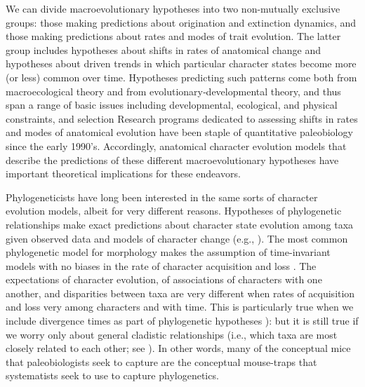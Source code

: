 \documentclass{article}
\begin{document}
We can divide macroevolutionary hypotheses into two non-mutually exclusive groups: those making predictions about origination and extinction dynamics, and those making predictions about rates and modes of trait evolution. 
The latter group includes hypotheses about shifts in rates of anatomical change and hypotheses about driven trends in which particular character states become more (or less) common over time.  
Hypotheses predicting such patterns come both from macroecological theory and from evolutionary‑developmental theory, and thus span a range of basic issues including developmental, ecological, and physical constraints, and selection  \citep{valentine1969patterns, valentine1980determinants}
Research programs dedicated to assessing shifts in rates and modes of anatomical evolution have been staple of quantitative paleobiology since the early 1990’s. 
Accordingly, anatomical character evolution models that describe the predictions of these different macroevolutionary hypotheses have important theoretical implications for these endeavors. 

Phylogeneticists have long been interested in the same sorts of character evolution models, albeit for very different reasons.  
Hypotheses of phylogenetic relationships make exact predictions about character state evolution among taxa given observed data and models of character change (e.g., \cite{Kimura1980, Felsenstein1981, Hasegawa1985, Tavare1986}).  
The most common phylogenetic model for morphology makes the assumption of time-invariant models with no biases in the rate of character acquisition and loss \citep{Lewis2001}.
The expectations of character evolution, of associations of characters with one another, and disparities between taxa are very different when rates of acquisition and loss very among characters and with time.
This is particularly true when we include divergence times as part of phylogenetic hypotheses \citep{Huelsenbeck2000a, Sanderson2002, Drummond2006}): but it is still true if we worry only about general cladistic relationships (i.e., which taxa are most closely related to each other; see \cite{Felsenstein1981, Nylander2004, Wright2016}).  
In other words, many of the conceptual mice that paleobiologists seek to capture are the conceptual mouse-traps that systematists seek to use to capture phylogenetics.  
\end{document}
